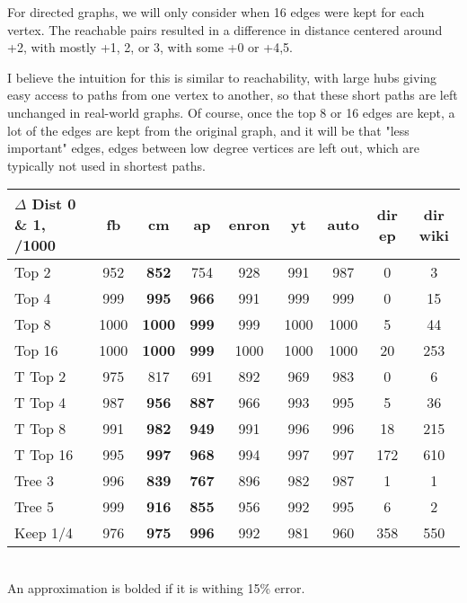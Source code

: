 \documentclass[11pt]{article}
\begin{document}
For directed graphs, we will only consider when 16 edges were kept for each vertex.  The reachable pairs resulted in a difference in distance centered around +2, with mostly +1, 2, or 3, with some +0 or +4,5.

I believe the intuition for this is similar to reachability, with large hubs giving easy access to paths from one vertex to another, so that these short paths are left unchanged in real-world graphs. Of course, once the top 8 or 16 edges are kept, a lot of the edges are kept from the original graph, and it will be that "less important" edges, edges between low degree vertices are left out, which are typically not used in shortest paths.

\begin{tabular}{| l | c | c | c | c | c | c | c | c |}
	\hline
	$\Delta$ Dist 0 \& 1, /1000 & \textbf{fb} & cm & ap & \textbf{enron} & \textbf{yt} & \textbf{auto} & dir ep & dir wiki \\ \hline
	Top 2 & 952 & \textbf{852} & 754 & 928 & 991 & 987 & 0 & 3\\ \hline
	Top 4 & 999 & \textbf{995} & \textbf{966} & 991 & 999 & 999 & 0 & 15\\ \hline
	Top 8 & 1000 & \textbf{1000} & \textbf{999} & 999 & 1000 & 1000 & 5 & 44\\ \hline
	Top 16 & 1000 & \textbf{1000} & \textbf{999} & 1000 & 1000 & 1000 & 20 & 253\\ \hline
	T Top 2 & 975 & 817 & 691 & 892 & 969 & 983 & 0 & 6\\ \hline
	T Top 4 & 987 & \textbf{956} & \textbf{887} & 966 & 993 & 995 & 5 & 36\\ \hline
	T Top 8 & 991 & \textbf{982} & \textbf{949} & 991 & 996 & 996 & 18 & 215\\ \hline
	T Top 16 & 995 & \textbf{997} & \textbf{968} & 994 & 997 & 997 & 172 & 610\\ \hline
	Tree 3 & 996 & \textbf{839} & \textbf{767} & 896 & 982 & 987 & 1 & 1\\ \hline
	Tree 5 & 999 & \textbf{916} & \textbf{855} & 956 & 992 & 995 & 6 & 2\\ \hline
	Keep 1/4 & 976 & \textbf{975} & \textbf{996} & 992 & 981 & 960 & 358 & 550\\ \hline


\end{tabular}\\
An approximation is bolded if it is withing 15\% error.
\end{document}
